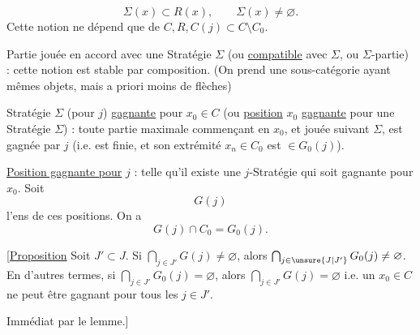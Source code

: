 \[
\Sigma(x)\subset R(x),\qquad\Sigma(x)\ne\varnothing.
\]
Cette notion ne dépend que de $C,R,C(j)\subset C\setminus C_0$.


Partie jouée en accord avec une Stratégie $\Sigma$ (ou \uline{compatible} avec $\Sigma$, ou $\Sigma$-partie) : cette notion est stable par composition. (On prend une sous-catégorie ayant mêmes objets, mais a priori moins de flèches)


Stratégie $\Sigma$ (pour $j$) \uline{gagnante} pour $x_0\in C$ (ou \uline{position} $x_0$ \uline{gagnante} pour une Stratégie $\Sigma$) : toute partie maximale commençant en $x_0$, et jouée suivant $\Sigma$, est gagnée par $j$ (i.e. est finie, et son extrémité $x_n\in C_0$ est $\in G_0(j)$).

\uline{Position  gagnante pour} $j$ : telle qu'il existe une $j$-Stratégie qui soit gagnante pour $x_0$. Soit
\[
G(j)
\]
l'ens de ces positions. On a
\[
G(j)\cap C_0=G_0(j).
\]

[\uline{Proposition} Soit $J'\subset J$. Si $\bigcap_{j\in J'}G(j)\ne\varnothing$, alors $\bigcap_{j\in\unsure{J|J'}}G_0(j)\ne\varnothing$. En d'autres termes, si $\bigcap_{j\in J'}G_0(j)=\varnothing$, alors $\bigcap_{j\in J'}G(j)=\varnothing$ i.e. un $x_0\in C$ ne peut être gagnant pour tous les $j\in J'$.

Immédiat par le lemme.]
